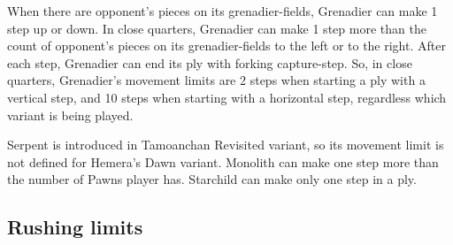 When there are opponent's pieces on its grenadier-fields, Grenadier can make 1
step up or down. In close quarters, Grenadier can make 1 step more than the count
of opponent's pieces on its grenadier-fields to the left or to the right. After
each step, Grenadier can end its ply with forking capture-step.\newline
\indent
So, in close quarters, Grenadier's movement limits are 2 steps when starting
a ply with a vertical step, and 10 steps when starting with a horizontal step,
regardless which variant is being played.

Serpent is introduced in Tamoanchan Revisited variant, so its movement limit is
not defined for Hemera's Dawn variant.\newline
\indent
Monolith can make one step more than the number of Pawns player has.
Starchild can make only one step in a ply.

\clearpage %

\subsection*{Rushing limits}
\label{sec:Appendix/Summary/Rushing limits}

